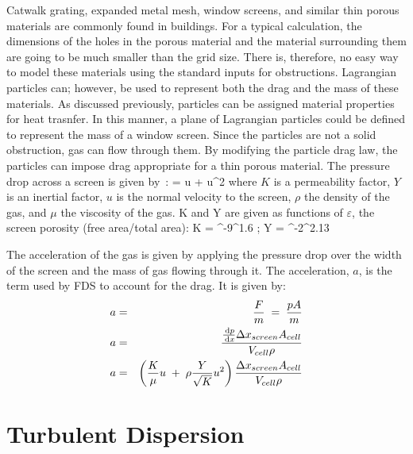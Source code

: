 Catwalk grating, expanded metal mesh, window screens, and similar thin porous materials are commonly found in buildings.  For a
typical calculation, the dimensions of the holes in the porous material and the material surrounding them are going to be much
smaller than the grid size.  There is, therefore, no easy way to model these materials using the standard inputs for obstructions.
Lagrangian particles can; however, be used to represent both the drag and the mass of these materials.  As discussed previously, particles can be assigned material properties for heat trasnfer.  In this manner, a plane of Lagrangian particles could be defined to represent the mass of a window screen.  Since the particles are not a solid obstruction, gas can flow through them.  By modifying the particle drag law, the particles can impose drag appropriate for a thin porous material.  The pressure drop across a screen is given by~\cite{Bartzanas:1}:
\be {} \; = \;  u \; + \; \rho {}u^2\ee
where $K$ is a permeability factor, $Y$ is an inertial factor, $u$ is the normal velocity to the screen, $\rho$ the density of the gas, and $\mu$ the viscosity of the gas.  K and Y are given as functions of $\varepsilon$, the screen porosity (free area/total area):
\be K \; =  ^{-9}\varepsilon^{1.6} \quad ; \quad Y \; =  ^{-2}\varepsilon^{2.13} \ee

The acceleration of the gas is given by applying the pressure drop over the width of the screen and the mass of gas flowing through 
it.  The acceleration, $a$, is the term used by FDS to account for the drag.  It is given by:
\begin{eqnarray}
a & = & \frac{F}{m} \; = \; \frac{p A}{m} \\
a & = & \frac{\frac{\,\mathrm{d} p}{\,\mathrm{d} x} \Delta x_{screen} A_{cell}}{V_{cell} \rho} \\
a & = & \left( \frac{K}{\mu} u \; + \; \rho \frac{Y}{\sqrt{K}}u^2 \right) \frac{\Delta x_{screen} A_{cell}}{V_{cell} \rho} 
\end{eqnarray}


\section{Turbulent Dispersion}

